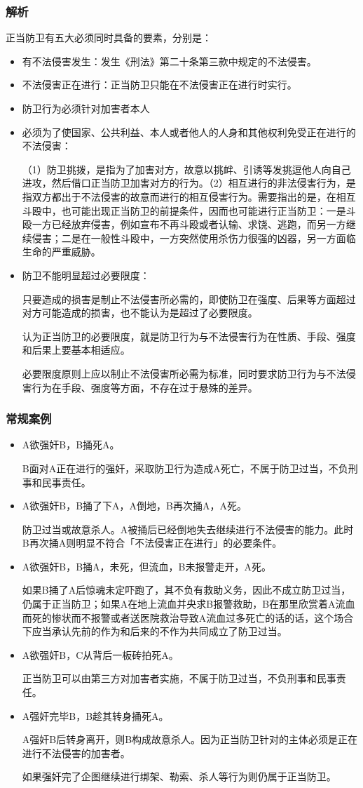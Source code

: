\documentclass[UTF8]{ctexart}
\begin{document}
\subsubsection{解析}
正当防卫有五大必须同时具备的要素，分别是：
\begin{itemize}
\item 有不法侵害发生：发生《刑法》第二十条第三款中规定的不法侵害。
\item 不法侵害正在进行：正当防卫只能在不法侵害正在进行时实行。
\item 防卫行为必须针对加害者本人
\item 必须为了使国家、公共利益、本人或者他人的人身和其他权利免受正在进行的不法侵害：

（1）防卫挑拨，是指为了加害对方，故意以挑衅、引诱等发挑逗他人向自己进攻，然后借口正当防卫加害对方的行为。（2）相互进行的非法侵害行为，是指双方都出于不法侵害的故意而进行的相互侵害行为。需要指出的是，在相互斗殴中，也可能出现正当防卫的前提条件，因而也可能进行正当防卫：一是斗殴一方已经放弃侵害，例如宣布不再斗殴或者认输、求饶、逃跑，而另一方继续侵害；二是在一般性斗殴中，一方突然使用杀伤力很强的凶器，另一方面临生命的严重威胁。
\item 防卫不能明显超过必要限度：

只要造成的损害是制止不法侵害所必需的，即使防卫在强度、后果等方面超过对方可能造成的损害，也不能认为是超过了必要限度。

认为正当防卫的必要限度，就是防卫行为与不法侵害行为在性质、手段、强度和后果上要基本相适应。

必要限度原则上应以制止不法侵害所必需为标准，同时要求防卫行为与不法侵害行为在手段、强度等方面，不存在过于悬殊的差异。
\end{itemize}
\subsubsection{常规案例}
\begin{itemize}
\item A欲强奸B，B捅死A。

B面对A正在进行的强奸，采取防卫行为造成A死亡，不属于防卫过当，不负刑事和民事责任。
\item A欲强奸B，B捅了下A，A倒地，B再次捅A，A死。

防卫过当或故意杀人。A被捅后已经倒地失去继续进行不法侵害的能力。此时B再次捅A则明显不符合「不法侵害正在进行」的必要条件。
\item A欲强奸B，B捅A，未死，但流血，B未报警走开，A死。

如果B捅了A后惊魂未定吓跑了，其不负有救助义务，因此不成立防卫过当，仍属于正当防卫；如果A在地上流血并央求B报警救助，B在那里欣赏着A流血而死的惨状而不报警或者送医院救治导致A流血过多死亡的话的话，这个场合下应当承认先前的作为和后来的不作为共同成立了防卫过当。
\item A欲强奸B，C从背后一板砖拍死A。

正当防卫可以由第三方对加害者实施，不属于防卫过当，不负刑事和民事责任。
\item A强奸完毕B，B趁其转身捅死A。

A强奸B后转身离开，则B构成故意杀人。因为正当防卫针对的主体必须是正在进行不法侵害的加害者。

如果强奸完了企图继续进行绑架、勒索、杀人等行为则仍属于正当防卫。
\end{itemize}
\end{document}
